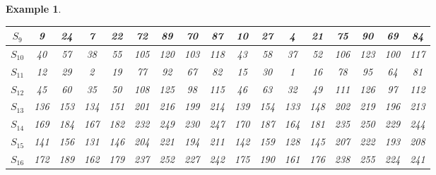 \documentclass[12pt, draftclsnofoot, onecolumn]{IEEEtran}
\newtheorem{example}{Example}
\begin{document}
\begin{example}
\begin{table*}[h!]
{\begin{tabular}{|c||c|c|c|c|c|c|c|c|c|c|c|c|c|c|c|c|}
$S_{9}$ & 9 & 24 & 7 & 22 & 72 & 89 & 70 & 87 & 10 & 27 & 4 & 21 & 75 & 90 & 69 & 84 \\ \hline

$S_{10}$ & 40 & 57 & 38 & 55 & 105 & 120 & 103 & 118 & 43 & 58 & 37 & 52 & 106 & 123 & 100 & 117 \\ \hline

$S_{11}$ & 12 & 29 & 2 & 19 & 77 & 92 & 67 & 82 & 15 & 30 & 1 & 16 & 78 & 95 & 64 & 81 \\ \hline

$S_{12}$ & 45 & 60 & 35 & 50 & 108 & 125 & 98 & 115 & 46 & 63 & 32 & 49 & 111 & 126 & 97 & 112 \\ \hline

$S_{13}$ & 136 & 153 & 134 & 151 & 201 & 216 & 199 & 214 & 139 & 154 & 133 & 148 & 202 & 219 & 196 & 213 \\ \hline

$S_{14}$ & 169 & 184 & 167 & 182 & 232 & 249 & 230 & 247 & 170 & 187 & 164 & 181 & 235 & 250 & 229 & 244 \\ \hline

$S_{15}$ & 141 & 156 & 131 & 146 & 204 & 221 & 194 & 211 & 142 & 159 & 128 & 145 & 207 & 222 & 193 & 208 \\ \hline

$S_{16}$ & 172 & 189 & 162 & 179 & 237 & 252 & 227 & 242 & 175 & 190 & 161 & 176 & 238 & 255 & 224 & 241 \\ \hline

\end{tabular}
\label{16-QAM MD}
}
\end{table*}   
\end{example}
\color{black} 
\end{document}
